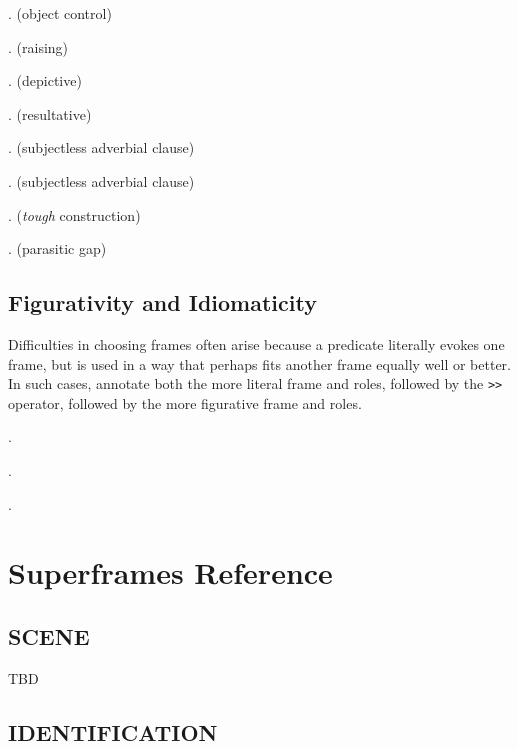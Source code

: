 \documentclass[a4paper]{article}
\newcommand{\fr}[1]{\textsf{#1}}
\begin{document}
\ex. (object control)

\ex. (raising)

\ex. (depictive)

\ex. (resultative)

\ex. (subjectless adverbial clause)

\ex. (subjectless adverbial clause)

\ex. (\emph{tough} construction)

\ex. (parasitic gap)

\subsection{Figurativity and Idiomaticity}

Difficulties in choosing frames often arise because a predicate literally evokes
one frame, but is used in a way that perhaps fits another frame equally well or
better. In such cases, annotate both the more literal frame and roles, followed
by the \texttt{>}\texttt{>} operator, followed by the more figurative frame and
roles.

\ex.

\ex.

\ex.

\section{Superframes Reference}

\subsection{\fr{SCENE}}
\label{sec:SCENE}

TBD

\subsection{\fr{IDENTIFICATION}}
\label{sec:IDENTIFICATION}
\end{document}
